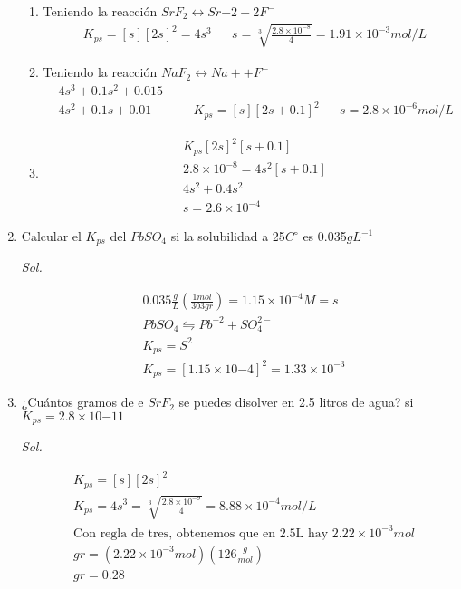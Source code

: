\begin{enumerate}
	      \begin{enumerate}
		      \item Teniendo la reacción $SrF_2\longleftrightarrow Sr{+2}+2F^-$
		            \begin{align*}
			             & K_{ps}=[s][2s]^2=4s^3 &  & s=\sqrt[3]{\frac{2.8\times10^{-8}}{4}}=1.91\times10^{-3}mol/L
		            \end{align*}
		      \item Teniendo la reacción $NaF_2\longleftrightarrow Na{+}+F^-$
		            \begin{align*}
			             & 4s^3+0.1s^2+0.015    &  &                          \\
			             & 4s^2+0.1s+0.01       &  &
			             & K_{ps}=[s][2s+0.1]^2 &  & s=2.8\times10^{-6} mol/L
		            \end{align*}
		      \item \begin{align*}
			             & K_{ps}[2s]^2[s+0.1]           \\
			             & 2.8\times 10^{-8}=4s^2[s+0.1] \\
			             & 4s^2+0.4s^2                   \\
			             & s=2.6\times 10^{-4}
		            \end{align*}
	      \end{enumerate}


	\item Calcular el $K_{ps}$ del $PbSO_4$ si la solubilidad a 25$C^{\circ}$ es 0.035$gL^{-1}$

	      \textit{ Sol. }

	      \begin{align*}
		       & 0.035\frac{g}{L}\left(\frac{1mol}{303gr}\right)=1.15\times 10^{-4}M=s \\
		       & PbSO_4\leftrightharpoons Pb^{+2}+SO_4^{2-}                            \\
		       & K_{ps}=S^2                                                            \\
		       & K_{ps}=[1.15\times10{-4}]^2=1.33\times 10^{-3}
	      \end{align*}


	\item ¿Cuántos gramos de e $SrF_2$ se puedes disolver en 2.5 litros de agua? si $K_{ps}=2.8\times 10{-11}$

	      \textit{ Sol. }

	      \begin{align*}
		       & K_{ps}=[s][2s]^2                                                           \\
		       & K_{ps}=4s^3=\sqrt[3]{\frac{2.8\times10^{-9}}{4}}=8.88\times10^{-4}mol/L    \\
		       & \text{Con regla de tres, obtenemos que en 2.5L hay } 2.22\times 10^{-3}mol \\
		       & gr=\left(2.22\times 10^{-3}mol\right)\left(126\frac{g}{mol}\right)         \\
		       & gr=0.28
	      \end{align*}


\end{enumerate}
